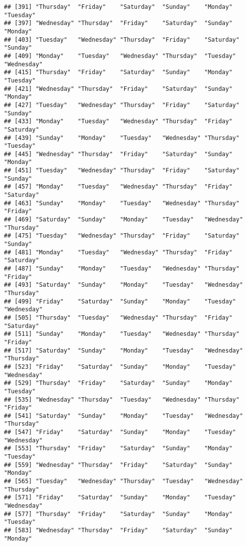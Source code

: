 \documentclass[
]{article}
\begin{document}
\begin{verbatim}
## [391] "Thursday"  "Friday"    "Saturday"  "Sunday"    "Monday"    "Tuesday"  
## [397] "Wednesday" "Thursday"  "Friday"    "Saturday"  "Sunday"    "Monday"   
## [403] "Tuesday"   "Wednesday" "Thursday"  "Friday"    "Saturday"  "Sunday"   
## [409] "Monday"    "Tuesday"   "Wednesday" "Thursday"  "Tuesday"   "Wednesday"
## [415] "Thursday"  "Friday"    "Saturday"  "Sunday"    "Monday"    "Tuesday"  
## [421] "Wednesday" "Thursday"  "Friday"    "Saturday"  "Sunday"    "Monday"   
## [427] "Tuesday"   "Wednesday" "Thursday"  "Friday"    "Saturday"  "Sunday"   
## [433] "Monday"    "Tuesday"   "Wednesday" "Thursday"  "Friday"    "Saturday" 
## [439] "Sunday"    "Monday"    "Tuesday"   "Wednesday" "Thursday"  "Tuesday"  
## [445] "Wednesday" "Thursday"  "Friday"    "Saturday"  "Sunday"    "Monday"   
## [451] "Tuesday"   "Wednesday" "Thursday"  "Friday"    "Saturday"  "Sunday"   
## [457] "Monday"    "Tuesday"   "Wednesday" "Thursday"  "Friday"    "Saturday" 
## [463] "Sunday"    "Monday"    "Tuesday"   "Wednesday" "Thursday"  "Friday"   
## [469] "Saturday"  "Sunday"    "Monday"    "Tuesday"   "Wednesday" "Thursday" 
## [475] "Tuesday"   "Wednesday" "Thursday"  "Friday"    "Saturday"  "Sunday"   
## [481] "Monday"    "Tuesday"   "Wednesday" "Thursday"  "Friday"    "Saturday" 
## [487] "Sunday"    "Monday"    "Tuesday"   "Wednesday" "Thursday"  "Friday"   
## [493] "Saturday"  "Sunday"    "Monday"    "Tuesday"   "Wednesday" "Thursday" 
## [499] "Friday"    "Saturday"  "Sunday"    "Monday"    "Tuesday"   "Wednesday"
## [505] "Thursday"  "Tuesday"   "Wednesday" "Thursday"  "Friday"    "Saturday" 
## [511] "Sunday"    "Monday"    "Tuesday"   "Wednesday" "Thursday"  "Friday"   
## [517] "Saturday"  "Sunday"    "Monday"    "Tuesday"   "Wednesday" "Thursday" 
## [523] "Friday"    "Saturday"  "Sunday"    "Monday"    "Tuesday"   "Wednesday"
## [529] "Thursday"  "Friday"    "Saturday"  "Sunday"    "Monday"    "Tuesday"  
## [535] "Wednesday" "Thursday"  "Tuesday"   "Wednesday" "Thursday"  "Friday"   
## [541] "Saturday"  "Sunday"    "Monday"    "Tuesday"   "Wednesday" "Thursday" 
## [547] "Friday"    "Saturday"  "Sunday"    "Monday"    "Tuesday"   "Wednesday"
## [553] "Thursday"  "Friday"    "Saturday"  "Sunday"    "Monday"    "Tuesday"  
## [559] "Wednesday" "Thursday"  "Friday"    "Saturday"  "Sunday"    "Monday"   
## [565] "Tuesday"   "Wednesday" "Thursday"  "Tuesday"   "Wednesday" "Thursday" 
## [571] "Friday"    "Saturday"  "Sunday"    "Monday"    "Tuesday"   "Wednesday"
## [577] "Thursday"  "Friday"    "Saturday"  "Sunday"    "Monday"    "Tuesday"  
## [583] "Wednesday" "Thursday"  "Friday"    "Saturday"  "Sunday"    "Monday"   

\end{verbatim}
\end{document}
